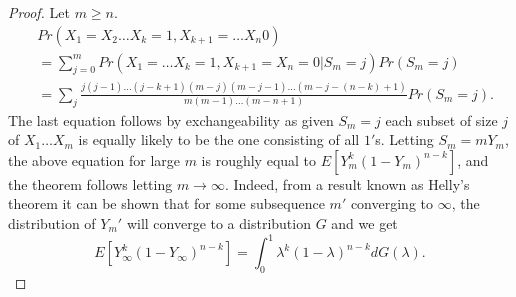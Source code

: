 \documentclass[a4paper,10pt,english]{article}
\begin{document}
\begin{proof}
Let $m \geq n $.
\begin{eqnarray*}
&Pr(X_1 = X_2 \hdots X_k =1, X_{k+1}= \hdots X_n 0 )\\
&=\sum_{j=0}^{m}Pr(X_1=\hdots X_k=1, X_{k+1}= X_{n}=0|S_m=j)Pr(S_m=j)\\
&=\sum_{j} \frac{j(j-1) \hdots (j-k+1)(m-j)(m-j-1) \hdots (m-j-(n-k)+1) }{m(m-1) \hdots (m-n+1)}Pr(S_m=j).
\end{eqnarray*}
The last equation follows by exchangeability as given $S_m=j$ each subset of size $j$ of $X_1 \hdots X_m$ is equally likely to be the one consisting of all $1'$s. Letting $S_m=mY_m$, the above equation for large $m$ is roughly equal to $E[Y_m^k(1-Y_m)^{n-k}]$, and the theorem follows letting $m \rightarrow \infty$. Indeed, from a result known as  Helly's theorem it can be shown that for some subsequence $m'$ converging to $\infty$, the distribution of $Y_m'$ will converge to a distribution $G$ and we get
\begin{equation*}
E[Y_{\infty}^k(1-Y_{\infty})^{n-k}] = \int_0^1 \lambda^k(1-\lambda)^{n-k}dG(\lambda).
\end{equation*} 
\end{proof}
\end{document}
